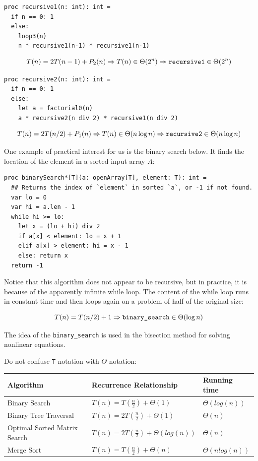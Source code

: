 \documentclass[justified, sixbynine]{tufte-book}
\def\ft{\small\tt}
\theoremstyle{plain}%
\newtheorem * {corollary}{Corollary}
\theoremstyle{definition}
\theoremstyle{remark}
\newtheorem * {remark}{Remark}
\newtheorem * {note}{Note}
\begin{document}
\begin{fullwidth}
\begin{lstlisting}
proc recursive1(n: int): int =
  if n == 0: 1
  else:
    loop3(n)
    n * recursive1(n-1) * recursive1(n-1)
\end{lstlisting}

\begin{equation}
T(n)=2T(n-1)+P_2(n)\Rightarrow T(n)\in \Theta (2^n)\Rightarrow \text{{\tt %
recursive1}}\in \Theta (2^n)
\end{equation}

\begin{lstlisting}
proc recursive2(n: int): int =
  if n == 0: 1
  else:
    let a = factorial0(n)
    a * recursive2(n div 2) * recursive1(n div 2)
\end{lstlisting}

\begin{equation}
T(n) = 2 T(n/2) + P_1(n) \Rightarrow T(n)\in \Theta (n\log n)\Rightarrow \text{%
{\tt recursive2}}\in \Theta (n\log n)
\end{equation}

One example of practical interest for us is the binary search below. It finds the location of the element in a sorted input array $A$:

\begin{lstlisting}
proc binarySearch*[T](a: openArray[T], element: T): int =
  ## Returns the index of `element` in sorted `a`, or -1 if not found.
  var lo = 0
  var hi = a.len - 1
  while hi >= lo:
    let x = (lo + hi) div 2
    if a[x] < element: lo = x + 1
    elif a[x] > element: hi = x - 1
    else: return x
  return -1
\end{lstlisting}

Notice that this algorithm does not appear to be recursive, but in practice, it is because of the apparently infinite while loop. The content of the while loop runs in constant time and then loops again on a problem of half of the original size:

\begin{equation}
T(n)=T(n/2)+1\Rightarrow \text{{\tt binary\_search}}\in \Theta(\log n)
\end{equation}

The idea of the {\ft binary\_search} is used in the bisection method for solving nonlinear equations.

Do not confuse {\ft T} notation with $\Theta$ notation:

\begin{table}
\begin{tabular}{|l|l|l|}\hline
Algorithm & Recurrence Relationship & Running time \\ \hline
Binary Search & $T(n) = T(\frac n 2) + \Theta (1)$ & $\Theta(log(n))$ \\ \hline
Binary Tree Traversal & $T(n) = 2T(\frac n 2) + \Theta (1)$ & $\Theta(n)$ \\ \hline
Optimal Sorted Matrix Search & $T(n) = 2T(\frac n 2) + \Theta (log(n))$ & $\Theta(n)$ \\ \hline
Merge Sort & $T(n) = T(\frac n 2) + \Theta (n)$ & $\Theta(n log(n))$ \\ \hline
\end{tabular}
\label{table1}
\end{table}


\end{fullwidth}
\end{document}
